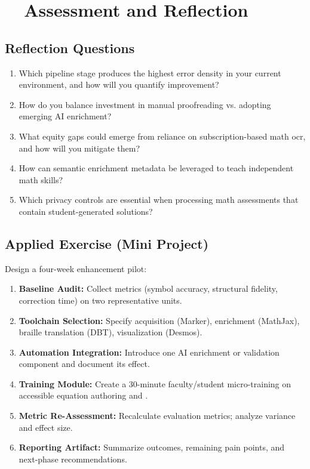 \section{~~Assessment and Reflection}\label{ch11:sec:assessment-reflection}

\subsection*{Reflection Questions}
\begin{enumerate}
	\item Which pipeline stage produces the highest error density in your current environment, and how will you quantify improvement?
	\item How do you balance investment in manual proofreading vs. adopting emerging AI enrichment?
	\item What equity gaps could emerge from reliance on subscription-based math \gls{ocr}, and how will you mitigate them?
	\item How can semantic enrichment metadata be leveraged to teach independent math  skills?
	\item Which privacy controls are essential when processing math assessments that contain student-generated solutions?
\end{enumerate}

\subsection*{Applied Exercise (Mini Project)}
Design a four-week  enhancement pilot:
\begin{enumerate}
	\item \textbf{Baseline Audit:} Collect metrics (symbol accuracy, structural fidelity, correction time) on two representative units.
	\item \textbf{Toolchain Selection:} Specify acquisition (Marker), enrichment (MathJax), braille translation (DBT), visualization (Desmos).
	\item \textbf{Automation Integration:} Introduce one AI enrichment or validation component and document its effect.
	\item \textbf{Training Module:} Create a 30-minute faculty/student micro-training on accessible equation authoring and .
	\item \textbf{Metric Re-Assessment:} Recalculate evaluation metrics; analyze variance and effect size.
	\item \textbf{Reporting Artifact:} Summarize outcomes, remaining pain points, and next-phase recommendations.
\end{enumerate}

